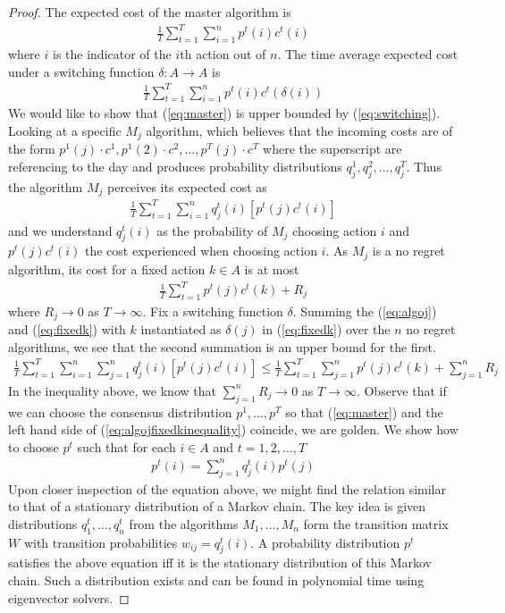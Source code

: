 \begin{thm}
\begin{proof}
The expected cost of the master algorithm is 
\begin{align}
\frac{1}{T}\sum_{t=1}^{T}\sum_{i=1}^{n}p^t(i)c^t(i) \label{eq:master}
\end{align}
where $i$ is the indicator of the $i$th action out of $n$. The time average expected cost under a switching function $\delta: A \to A$ is 
\begin{align}
\frac{1}{T}\sum_{t=1}^{T}\sum_{i=1}^{n}p^t(i)c^t(\delta(i))\label{eq:switching}
\end{align}
We would like to show that (\ref{eq:master}) is upper bounded by (\ref{eq:switching}). Looking at a specific $M_j$ algorithm, which believes that the incoming costs are of the form $p^1(j)\cdot c^1,p^1(2)\cdot c^2, \ldots, p^T(j)\cdot c^T$ where the superscript are referencing to the day and produces probability distributions $q^1_j, q^2_j,\ldots,q^T_j$. Thus the algorithm $M_j$ perceives its expected cost as 
\begin{align}
\frac{1}{T}\sum_{t=1}^{T}\sum_{i=1}^{n}q^t_j(i)[p^t(j)c^t(i)]\label{eq:algoj}
\end{align}
and we understand $q^t_j(i)$ as the probability of $M_j$ choosing action $i$ and $p^t(j)c^t(i)$ the cost experienced when choosing action $i$. As $M_j$ is a no regret algorithm, its cost for a fixed action $k\in A$ is at most 
\begin{align}
\frac{1}{T}\sum_{t=1}^{T}p^t(j)c^t(k)+R_j\label{eq:fixedk}
\end{align}
where $R_j \to 0$ as $T \to \infty$. Fix a switching function $\delta$. Summing the (\ref{eq:algoj}) and (\ref{eq:fixedk}) with $k$ instantiated as $\delta(j)$ in (\ref{eq:fixedk}) over the $n$ no regret algorithms, we see that the second summation is an upper bound for the first.
\begin{align}
\frac{1}{T}\sum_{t=1}^{T}\sum_{i=1}^{n}\sum_{j=1}^{n}q^t_j(i)[p^t(j)c^t(i)]\leq \frac{1}{T}\sum_{t=1}^{T}\sum_{j=1}^{n}p^t(j)c^t(k)+\sum_{j=1}^{n}R_j \label{eq:algojfixedkinequality}
\end{align}
In the inequality above, we know that $\sum_{j=1}^{n}R_j \to 0$ as $T \to \infty$. Observe that if we can choose the consensus distribution $p^1,\ldots, p^T$ so that (\ref{eq:master}) and the left hand side of (\ref{eq:algojfixedkinequality}) coincide, we are golden. We show how to choose $p^t$ such that for each $i \in A$ and $t=1,2,\ldots, T$
\begin{align*}
p^t(i)=\sum_{j=1}^{n}q^t_j(i)p^t(j)
\end{align*}
Upon closer inspection of  the equation above, we might find the relation similar to that of a stationary distribution of a Markov chain. The key idea is given distributions $q^t_1,\ldots, q^t_n$ from the algorithms $M_1, \ldots, M_n$ form the transition matrix $W$ with transition probabilities $w_{ij}=q^t_j(i)$. A probability distribution $p^t$ satisfies the above equation iff it is the stationary distribution of this Markov chain. Such a distribution exists and can be found in polynomial time using eigenvector solvers.
\end{proof}

\end{thm}




